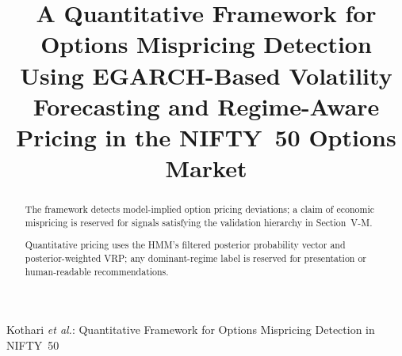 \documentclass[journal]{IEEEtran}
\begin{document}
\title{A Quantitative Framework for Options Mispricing Detection Using
EGARCH-Based Volatility Forecasting and Regime-Aware Pricing in the
NIFTY~50 Options Market}

\author{%
  \IEEEauthorblockA{}%
}

\markboth{}%
{Kothari \MakeLowercase{\textit{et al.}}: Quantitative Framework for
Options Mispricing Detection in NIFTY~50}

\maketitle

\begin{abstract}
The framework detects model-implied option pricing deviations; a claim
of economic mispricing is reserved for signals satisfying the
validation hierarchy in Section~V-M.

Quantitative pricing uses the HMM's filtered posterior probability
vector and posterior-weighted VRP; any dominant-regime label is
reserved for presentation or human-readable recommendations.


\end{abstract}
\end{document}
